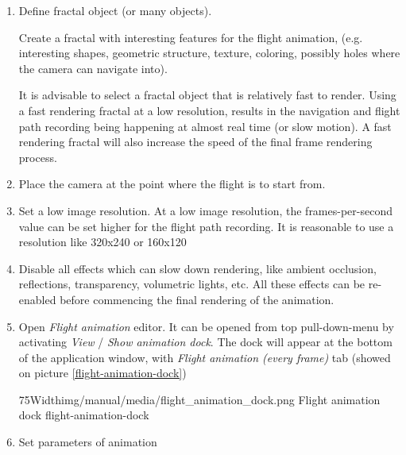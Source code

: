 \begin{enumerate}
	\item Define fractal object (or many objects). 
	
	Create a fractal with interesting features for the flight animation, (e.g. interesting shapes, geometric structure, texture, coloring, possibly holes where the camera can navigate into).
	
	It is advisable to select a fractal object that is relatively fast to render. Using a fast rendering fractal at a low resolution, results in the navigation and flight path recording being happening at almost real time (or slow motion). A fast rendering fractal will also increase the speed of the final frame rendering process.
	
	\item Place the camera at the point where the flight is to start from.
			
	\item Set a low image resolution. At a low image resolution, the frames-per-second value can be set higher for the flight path recording. It is reasonable to use a resolution like 320x240 or 160x120
	
	\item Disable all effects which can slow down rendering, like ambient occlusion, reflections, transparency, volumetric lights, etc. All these effects can be re-enabled before commencing the final rendering of the animation.
	
	\item Open \emph{Flight animation} editor. It can be opened from top pull-down-menu by activating \emph{View} / \emph{Show animation dock}. The dock will appear at the bottom of the application window, with \emph{Flight animation (every frame)} tab (showed on picture \ref{flight-animation-dock})
	
	\simpleImageWithCaption75Width{img/manual/media/flight_animation_dock.png}
	{Flight animation dock}
	{flight-animation-dock}
	
	\item Set parameters of animation
	

\end{enumerate}
